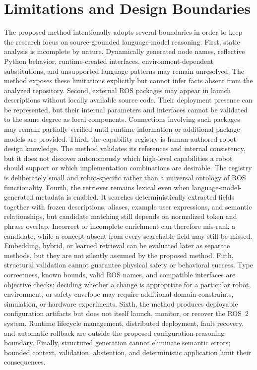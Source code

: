 \section{Limitations and Design Boundaries}
The proposed method intentionally adopts several boundaries in order to keep the research focus on source-grounded language-model reasoning.
First, static analysis is incomplete by nature. Dynamically generated node names, reflective Python behavior, runtime-created interfaces, environment-dependent substitutions, and unsupported language patterns may remain unresolved. The method exposes these limitations explicitly but cannot infer facts absent from the analyzed repository.
Second, external ROS packages may appear in launch descriptions without locally available source code. Their deployment presence can be represented, but their internal parameters and interfaces cannot be validated to the same degree as local components. Connections involving such packages may remain partially verified until runtime information or additional package models are provided.
Third, the capability registry is human-authored robot design knowledge. The method validates its references and internal consistency, but it does not discover autonomously which high-level capabilities a robot should support or which implementation combinations are desirable. The registry is deliberately small and robot-specific rather than a universal ontology of ROS functionality.
Fourth, the retriever remains lexical even when language-model-generated metadata is enabled. It searches deterministically extracted fields together with frozen descriptions, aliases, example user expressions, and semantic relationships, but candidate matching still depends on normalized token and phrase overlap. Incorrect or incomplete enrichment can therefore mis-rank a candidate, while a concept absent from every searchable field may still be missed. Embedding, hybrid, or learned retrieval can be evaluated later as separate methods, but they are not silently assumed by the proposed method.
Fifth, structural validation cannot guarantee physical safety or behavioral success. Type correctness, known bounds, valid ROS names, and compatible interfaces are objective checks; deciding whether a change is appropriate for a particular robot, environment, or safety envelope may require additional domain constraints, simulation, or hardware experiments.
Sixth, the method produces deployable configuration artifacts but does not itself launch, monitor, or recover the ROS~2 system. Runtime lifecycle management, distributed deployment, fault recovery, and automatic rollback are outside the proposed configuration-reasoning boundary.
Finally, structured generation cannot eliminate semantic errors; bounded context, validation, abstention, and deterministic application limit their consequences.
